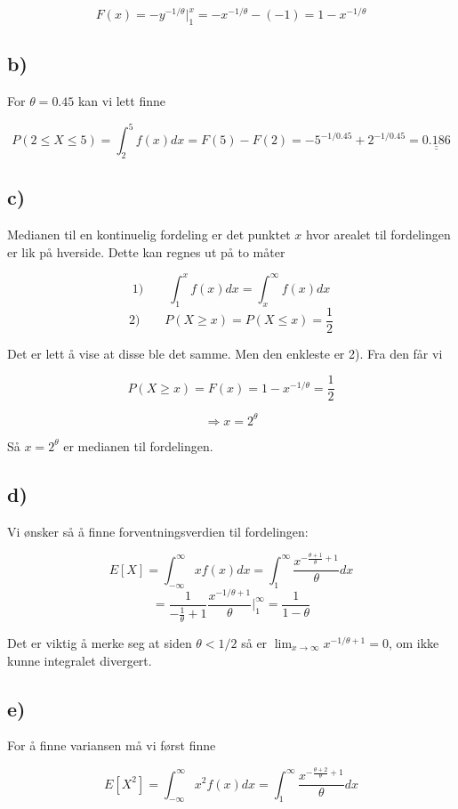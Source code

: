 \documentclass[a4paper,norsk, 10pt]{article}
\begin{document}
$$
F(x) = -y^{-1/\theta}\bigg\vert_1^x = -x^{-1/\theta} - (-1) = 1 -x^{-1/\theta}
$$

\subsection*{b)}

For $\theta = 0.45$ kan vi lett finne

$$
P(2 \leq X \leq 5) = \int_2^5 f(x) dx = F(5)-F(2) = -5^{-1/0.45} + 2^{-1/0.45} = \underline{\underline{0.186}}
$$

\subsection*{c)}

Medianen til en kontinuelig fordeling er det punktet $x$ hvor arealet til fordelingen er lik på hverside. Dette kan regnes ut på to måter

$$
1) \qquad \int_{1}^x f(x) dx = \int_x^{\infty} f(x) dx
$$
$$
2) \qquad P(X \geq x) = P(X \leq x) = \frac{1}{2}
$$

Det er lett å vise at disse ble det samme. Men den enkleste er 2). Fra den får vi 

$$
P(X \geq x) = F(x) = 1-x^{-1/\theta} = \frac{1}{2}
$$

$$
\Rightarrow x = 2^{\theta}
$$

Så $x = 2^{\theta}$ er medianen til fordelingen.

\subsection*{d)}
Vi ønsker så å finne forventningsverdien til fordelingen:

$$
E[X] = \int_{-\infty}^{\infty} xf(x) dx = \int_1^{\infty} \frac{x^{-\frac{\theta +1}{\theta} + 1}}{\theta} dx
$$
$$
= \frac{1}{-\frac{1}{\theta} + 1}\frac{x^{-1/\theta + 1}}{\theta} \bigg\vert_1^{\infty} = \frac{1}{1-\theta}
$$

Det er viktig å merke seg at siden $\theta < 1/2$ så er $\lim_{x \rightarrow \infty} x^{-1/\theta + 1} = 0$, om ikke kunne integralet divergert.


\subsection*{e)}

For å finne variansen må vi først finne

$$
E[X^2] = \int_{-\infty}^{\infty} x^2f(x) dx = \int_1^{\infty} \frac{x^{-\frac{\theta +2}{\theta} + 1}}{\theta} dx
$$
\end{document}
